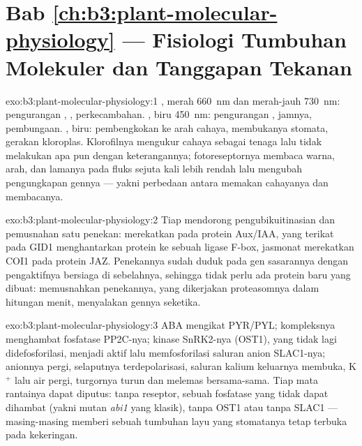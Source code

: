\section*{Bab \ref{ch:b3:plant-molecular-physiology} --- Fisiologi Tumbuhan Molekuler dan Tanggapan Tekanan}

\begin{solution}{exo:b3:plant-molecular-physiology:1}
, merah \qty{660}{nm} dan merah-jauh \qty{730}{nm}:
pengurangan , , perkecambahan. , biru
\qty{450}{nm}: pengurangan , jamnya, pembungaan. , biru:
pembengkokan ke arah cahaya, membukanya stomata, gerakan kloroplas.
Klorofilnya mengukur cahaya sebagai tenaga lalu tidak melakukan apa pun dengan
keterangannya; fotoreseptornya membaca warna, arah, dan lamanya pada
fluks sejuta kali lebih rendah lalu mengubah pengungkapan gennya --- yakni
perbedaan antara memakan cahayanya dan membacanya.
\end{solution}

\begin{solution}{exo:b3:plant-molecular-physiology:2}
Tiap  mendorong pengubikuitinasian dan pemusnahan satu
penekan:  merekatkan  pada protein Aux/IAA,  yang terikat
pada GID1 menghantarkan protein  ke sebuah ligase F-box, jasmonat merekatkan
COI1 pada protein JAZ. Penekannya sudah duduk pada gen sasarannya
dengan pengaktifnya bersiaga di sebelahnya, sehingga tidak perlu ada protein baru yang
dibuat: memusnahkan penekannya, yang dikerjakan proteasomnya dalam
hitungan menit, menyalakan gennya seketika.
\end{solution}

\begin{solution}{exo:b3:plant-molecular-physiology:3}
ABA mengikat PYR/PYL; kompleksnya menghambat fosfatase PP2C-nya;
kinase SnRK2-nya (OST1), yang tidak lagi didefosforilasi, menjadi aktif lalu
memfosforilasi saluran anion SLAC1-nya; anionnya pergi, selaputnya
terdepolarisasi, saluran kalium keluarnya membuka, K$^{+}$ lalu air
pergi, turgornya turun dan  melemas bersama-sama. Tiap mata rantainya dapat
diputus: tanpa reseptor, sebuah fosfatase yang tidak dapat dihambat (yakni
mutan \emph{abi1} yang klasik), tanpa OST1 atau tanpa SLAC1 --- masing-masing memberi sebuah
tumbuhan layu yang stomatanya tetap terbuka pada kekeringan.
\end{solution}

